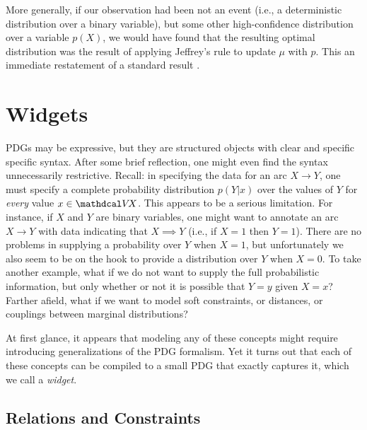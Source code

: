 More generally, if our observation had been not an event (i.e., a deterministic distribution over a binary variable), but some other high-confidence distribution over a variable $p(X)$, we would have found that the resulting optimal distribution was the result of applying Jeffrey's rule \citep{	  Jeffrey68} to update $\mu$ with $p$. 
This an immediate restatement of a standard result
    \citep[pg. 109]{halpern-RAU}.



\section{Widgets}
    \label{sec:widgets}

PDGs may be expressive, but they are structured objects with clear and specific specific syntax.
After some brief reflection, one might even find the syntax unnecessarily restrictive. 
Recall: in specifying the data for an arc $X \to Y$, one must specify a complete probability distribution $p(Y | x)$ over the values of $Y$ for \emph{every} value $x \in \V\!X$. 
This appears to be a serious limitation.
For instance, if $X$ and $Y$ are binary variables, one might want to 
annotate an arc $X \to Y$ with data indicating that $X \implies Y$
    (i.e., if $X=1$ then $Y=1$).
There are no problems in supplying a probability over $Y$ when $X{=}1$,
but unfortunately we also seem to be on the hook to provide
    a distribution over $Y$ when $X{=}0$. 
To take another example, what if we do not want to supply the full probabilistic information, but only whether or not it is possible that $Y{=}y$ given $X{=}x$? 
Farther afield, what if we want to model soft constraints, or distances, or couplings between marginal distributions?

At first glance, it appears that modeling any of these concepts might require introducing generalizations of the PDG formalism. 
Yet it turns out that each of these concepts can be compiled to a small PDG that exactly captures it, which we call a \emph{widget}. 


\subsection{Relations and Constraints}
    \label{sec:relation-widget}
    \label{sec:constraint-widget}


